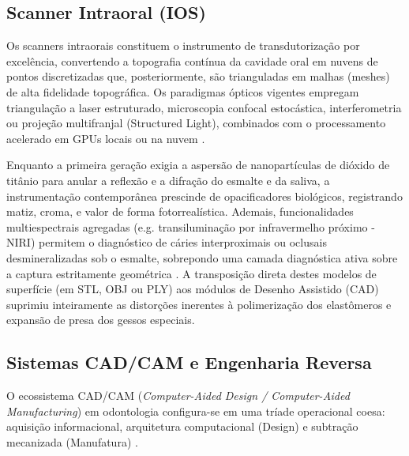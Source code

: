 \subsection{Scanner Intraoral (IOS)}
\label{subsec:scanner}

Os scanners intraorais constituem o instrumento de transdutorização por excelência, convertendo a topografia contínua da cavidade oral em nuvens de pontos discretizadas que, posteriormente, são trianguladas em malhas (meshes) de alta fidelidade topográfica. Os paradigmas ópticos vigentes empregam triangulação a laser estruturado, microscopia confocal estocástica, interferometria ou projeção multifranjal (Structured Light), combinados com o processamento acelerado em GPUs locais ou na nuvem \cite{elsaid2025digital}.


Enquanto a primeira geração exigia a aspersão de nanopartículas de dióxido de titânio para anular a reflexão e a difração do esmalte e da saliva, a instrumentação contemporânea prescinde de opacificadores biológicos, registrando matiz, croma, e valor de forma fotorrealística. Ademais, funcionalidades multiespectrais agregadas (e.g. transiluminação por infravermelho próximo - NIRI) permitem o diagnóstico de cáries interproximais ou oclusais desmineralizadas sob o esmalte, sobrepondo uma camada diagnóstica ativa sobre a captura estritamente geométrica \cite{alshadidi2024surface}. A transposição direta destes modelos de superfície (em STL, OBJ ou PLY) aos módulos de Desenho Assistido (CAD) suprimiu inteiramente as distorções inerentes à polimerização dos elastômeros e expansão de presa dos gessos especiais.

\subsection{Sistemas CAD/CAM e Engenharia Reversa}
\label{subsec:cadcam}

O ecossistema CAD/CAM (\textit{Computer-Aided Design / Computer-Aided Manufacturing}) em odontologia configura-se em uma tríade operacional coesa: aquisição informacional, arquitetura computacional (Design) e subtração mecanizada (Manufatura) \cite{katsoulakis2024digital}.

